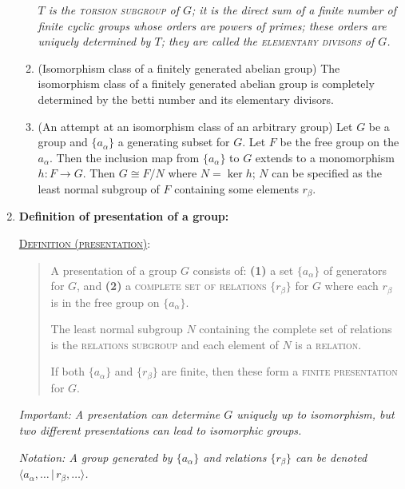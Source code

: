 \documentclass[letterpaper, 12pt]{article}
\newcommand{\defn}[2]{\textsc{\underline{Definition (#1)}:}\begin{quote} #2\end{quote}}
\begin{document}
\begin{enumerate}[resume]
\begin{enumerate}
            \textit{$T$ is the \textsc{torsion subgroup} of $G$; it is the direct sum of a finite number of finite cyclic groups whose orders are powers of primes; these orders are uniquely determined by $T$; they are called the \textsc{elementary divisors} of $G$.}
            \item (Isomorphism class of a finitely generated abelian group) The isomorphism class of a finitely generated abelian group is completely determined by the betti number and its elementary divisors.
            \item (An attempt at an isomorphism class of an arbitrary group) Let $G$ be a group and $\{a_\alpha\}$ a generating subset for $G$. Let $F$ be the free group on the $a_\alpha$. Then the inclusion map from $\{a_\alpha\}$ to $G$ extends to a monomorphism $h:F\to G$. Then $G\cong F/N$ where $N = \ker{h}$; $N$ can be specified as the least normal subgroup of $F$ containing some elements $r_\beta$.
            \end{enumerate}
        \item \textbf{Definition of presentation of a group:}

            \defn{presentation}{A presentation of a group $G$ consists of: \textbf{(1)} a set $\{a_\alpha\}$ of generators for $G$, and \textbf{(2)} a \textsc{complete set of relations} $\{r_\beta\}$ for $G$ where each $r_\beta$ is in the free group on $\{a_\alpha\}$.

            The least normal subgroup $N$ containing the complete set of relations is the \textsc{relations subgroup} and each element of $N$ is a \textsc{relation}.

            If both $\{a_\alpha\}$ and $\{r_\beta\}$ are finite, then these form a \textsc{finite presentation} for $G$.}

            \textit{Important: A presentation can determine $G$ uniquely up to isomorphism, but two different presentations can lead to isomorphic groups.}

            \textit{Notation: A group generated by $\{a_\alpha\}$ and relations $\{r_\beta\}$ can be denoted $\langle a_\alpha, \dots\,|\,r_\beta, \dots\rangle$.}
        \end{enumerate}
\end{document}
